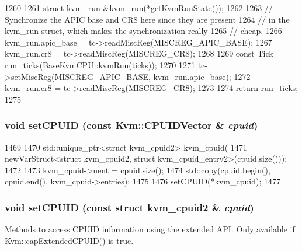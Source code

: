 \begin{DoxyCode}
1260 {
1261     struct kvm_run &kvm_run(*getKvmRunState());
1262 
1263     // Synchronize the APIC base and CR8 here since they are present
1264     // in the kvm_run struct, which makes the synchronization really
1265     // cheap.
1266     kvm_run.apic_base = tc->readMiscReg(MISCREG_APIC_BASE);
1267     kvm_run.cr8 = tc->readMiscReg(MISCREG_CR8);
1268 
1269     const Tick run_ticks(BaseKvmCPU::kvmRun(ticks));
1270 
1271     tc->setMiscReg(MISCREG_APIC_BASE, kvm_run.apic_base);
1272     kvm_run.cr8 = tc->readMiscReg(MISCREG_CR8);
1273 
1274     return run_ticks;
1275 }
\end{DoxyCode}
\hypertarget{classX86KvmCPU_a6782fae08bf69ed6903f49bfbee81566}{
\subsubsection[{setCPUID}]{\setlength{\rightskip}{0pt plus 5cm}void setCPUID (const {\bf Kvm::CPUIDVector} \& {\em cpuid})}}
\label{classX86KvmCPU_a6782fae08bf69ed6903f49bfbee81566}



\begin{DoxyCode}
1469 {
1470     std::unique_ptr<struct kvm_cpuid2> kvm_cpuid(
1471         newVarStruct<struct kvm_cpuid2, struct kvm_cpuid_entry2>(cpuid.size()));
1472 
1473     kvm_cpuid->nent = cpuid.size();
1474     std::copy(cpuid.begin(), cpuid.end(), kvm_cpuid->entries);
1475 
1476     setCPUID(*kvm_cpuid);
1477 }
\end{DoxyCode}
\hypertarget{classX86KvmCPU_ae1aa75790696eb8780d159812f607921}{
\subsubsection[{setCPUID}]{\setlength{\rightskip}{0pt plus 5cm}void setCPUID (const struct kvm\_\-cpuid2 \& {\em cpuid})}}
\label{classX86KvmCPU_ae1aa75790696eb8780d159812f607921}
Methods to access CPUID information using the extended API. Only available if \hyperlink{classKvm_a6db5aefbe1a9535f5124ef07a04e23a5}{Kvm::capExtendedCPUID()} is true. 


